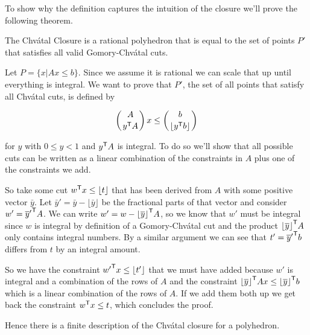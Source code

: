 To show why the definition captures the intuition of the closure we'll prove the following theorem.

\begin{thm} The Chv\'{a}tal Closure is a rational polyhedron that is equal to the set of points $P'$ that satisfies all valid Gomory-Chv\'atal cuts.\end{thm}

\begin{pr} Let $P=\{x|Ax\leq b\}$. Since we assume it is rational we can scale that up until everything is integral. We want to prove that $P'$, the set of all points that satisfy all Chv\'atal cuts, is defined by

\[\left({A}\atop{{y}^\text{\upshape \sffamily T} A}\right) x \leq \left({b}\atop {\lfloor {y}^\text{\upshape \sffamily T} b\rfloor}\right)\]

for $y$ with $0\leq y < 1$ and ${y}^\text{\upshape \sffamily T} A$ is integral. To do so we'll show that all possible cuts can be written as a linear combination of the constraints in $A$ plus one of the constraints we add.

So take some cut ${w}^\text{\upshape \sffamily T} x \leq \lfloor t\rfloor$ that has been derived from $A$ with some positive vector $\bar y$. Let $\bar y'= \bar y - \lfloor \bar y\rfloor$ be the fractional parts of that vector and consider $w'={\overline y'}^\text{\upshape \sffamily T}A$. We can write $w'=w-{\lfloor \overline y \rfloor}^\text{\upshape \sffamily T}A$, so we know that $w'$ must be integral since $w$ is integral by definition of a Gomory-Chv\'atal cut and the product ${\lfloor \overline y \rfloor}^\text{\upshape \sffamily T}A$ only contains integral numbers. By a similar argument we can see that $t' = {\overline y'}^\text{\upshape \sffamily T}b$ differs from $t$ by an integral amount.

So we have the constraint ${w'}^\text{\upshape \sffamily T}x\leq \lfloor t'\rfloor$ that we must have added because $w'$ is integral and a combination of the rows of $A$ and the constraint ${\lfloor \overline y \rfloor}^\text{\upshape \sffamily T} Ax\leq {\lfloor \overline y\rfloor}^\text{\upshape \sffamily T} b$ which is a linear combination of the rows of $A$. If we add them both up we get back the constraint ${w}^\text{\upshape \sffamily T} x\leq t$, which concludes the proof.
\end{pr}

Hence there is a finite description of the Chv\'atal closure for a polyhedron.